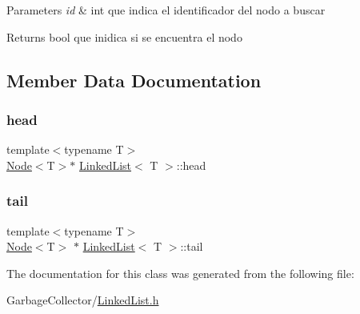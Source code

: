 \begin{DoxyParams}{Parameters}
{\em id} & int que indica el identificador del nodo a buscar \\
\hline
\end{DoxyParams}
\begin{DoxyReturn}{Returns}
bool que inidica si se encuentra el nodo 
\end{DoxyReturn}


\subsection{Member Data Documentation}
\mbox{\label{class_linked_list_a35e09287e2d2943707b011208e7a8ed2}} 
\subsubsection{\texorpdfstring{head}{head}}
{\footnotesize\ttfamily template$<$typename T$>$ \\
\hyperlink{class_node}{Node}$<$T$>$$\ast$ \hyperlink{class_linked_list}{Linked\+List}$<$ T $>$\+::head}

\mbox{\label{class_linked_list_a428d620b6c645b408e0d6afd30335f63}} 
\subsubsection{\texorpdfstring{tail}{tail}}
{\footnotesize\ttfamily template$<$typename T$>$ \\
\hyperlink{class_node}{Node}$<$T$>$ $\ast$ \hyperlink{class_linked_list}{Linked\+List}$<$ T $>$\+::tail}



The documentation for this class was generated from the following file\+:\begin{DoxyCompactItemize}
\item 
Garbage\+Collector/\hyperlink{_linked_list_8h}{Linked\+List.\+h}\end{DoxyCompactItemize}
